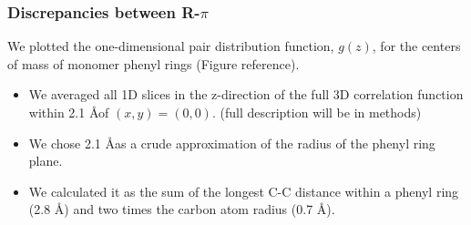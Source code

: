 \documentclass{article}
\begin{document}

  \subsubsection{Discrepancies between R-$\pi$}\label{section:rpi}
  
  We plotted the one-dimensional pair distribution function, $g(z)$, for the centers
  of mass of monomer phenyl rings (Figure reference).
  \begin{itemize}
  		\item We averaged all 1D slices in the z-direction of the full 3D correlation function
  		within 2.1 \AA of $(x, y)=(0, 0)$. (full description will be in methods)
  		\item We chose 2.1 \AA as a crude approximation of the radius of the phenyl ring
  		plane. 
  		\item We calculated it as the sum of the longest C-C distance within a phenyl 
  		ring (2.8 \AA) and two times the carbon atom radius (0.7 \AA).
  \end{itemize}
  
\end{document}
